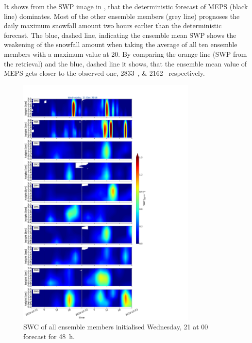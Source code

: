 It shows from the SWP image in , that the deterministic forecast of MEPS (black line) dominates. Most of the other ensemble members (grey line) prognoses the daily maximum snowfall amount two hours earlier than the deterministic forecast. The blue, dashed line, indicating the ensemble mean SWP shows the weakening of the snowfall amount when taking the average of all ten ensemble members with a maximum value at \SI{20}{\UTC}. By comparing the orange line (SWP from the retrieval) and the blue, dashed line it shows, that the ensemble mean value of MEPS gets closer to the observed one, \SIlist{2833; 2162}{\SWP} respectively.
%
\begin{figure}[t]
	\centering
	\includegraphics[trim={0cm 0cm 18.3cm 5.1cm},clip,width=0.8\textwidth]{./fig_09EM/20161221}
	\caption{SWC of all ensemble members initialised Wednesday, \SI{21}{\dec} at 0\SI{0}{\UTC} forecast for \SI{48}{\hour}.}\label{fig:EM09_21}
\end{figure}
